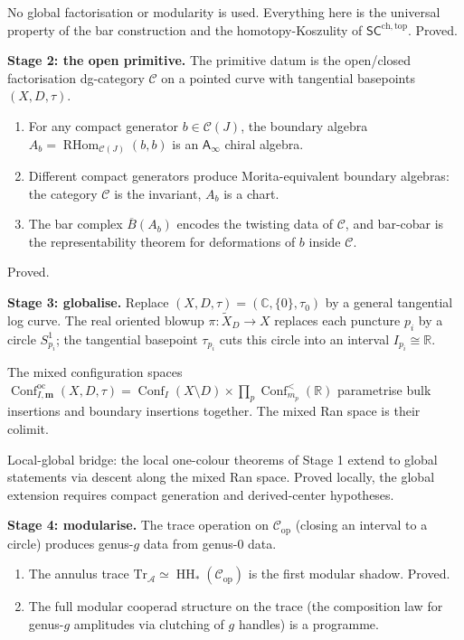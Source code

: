 \documentclass[11pt]{article}
\newcommand{\cA}{\mathcal{A}}
\newcommand{\cC}{\mathcal{C}}
\newcommand{\barB}{\overline{B}}
\newcommand{\C}{\mathbb{C}}
\newcommand{\R}{\mathbb{R}}
\newcommand{\Ainf}{\mathsf{A}_{\infty}}
\newcommand{\SCchtop}{\mathsf{SC}^{\mathrm{ch,top}}}
\newcommand{\RHom}{\operatorname{RHom}}
\newcommand{\HH}{\operatorname{HH}}
\DeclareMathOperator{\Conf}{Conf}
\begin{document}
No global factorisation or modularity is used.  Everything here
is the universal property of the bar construction and the
homotopy-Koszulity of $\SCchtop$.  Proved.

\medskip

\noindent
\textbf{Stage 2: the open primitive.}
The primitive datum is the open/closed factorisation dg-category
$\cC$ on a pointed curve with tangential basepoints
$(X, D, \tau)$.

\begin{enumerate}[label=\textup{(\alph*)},nosep]
\item For any compact generator $b \in \cC(J)$, the boundary
  algebra $A_b = \RHom_{\cC(J)}(b,b)$ is an $\Ainf$ chiral
  algebra.
\item Different compact generators produce Morita-equivalent
  boundary algebras: the category $\cC$ is the invariant,
  $A_b$ is a chart.
\item The bar complex $\barB(A_b)$ encodes the twisting data
  of $\cC$, and bar-cobar is the representability theorem for
  deformations of $b$ inside $\cC$.
\end{enumerate}

Proved.

\medskip

\noindent
\textbf{Stage 3: globalise.}
Replace $(X, D, \tau) = (\C, \{0\}, \tau_0)$ by a general
tangential log curve.  The real oriented blowup
$\pi\colon \widetilde{X}_D \to X$ replaces each puncture $p_i$
by a circle $S^1_{p_i}$; the tangential basepoint $\tau_{p_i}$
cuts this circle into an interval $I_{p_i} \cong \R$.

The mixed configuration spaces
$\Conf^{\mathrm{oc}}_{I,\mathbf{m}}(X, D, \tau)
= \Conf_I(X \setminus D) \times \prod_p \Conf^<_{m_p}(\R)$
parametrise bulk insertions and boundary insertions together.
The mixed Ran space is their colimit.

Local-global bridge: the local one-colour theorems of Stage 1
extend to global statements via descent along the mixed Ran space.
Proved locally, the global extension requires compact generation
and derived-center hypotheses.

\medskip

\noindent
\textbf{Stage 4: modularise.}
The trace operation on $\cC_{\mathrm{op}}$ (closing an interval
to a circle) produces genus-$g$ data from genus-$0$ data.

\begin{enumerate}[label=\textup{(\alph*)},nosep]
\item The annulus trace
  $\mathrm{Tr}_\cA \simeq \HH_*(\cC_{\mathrm{op}})$ is the
  first modular shadow.  Proved.
\item The full modular cooperad structure on the trace (the
  composition law for genus-$g$ amplitudes via clutching of $g$
  handles) is a programme.
\end{enumerate}
\end{document}
